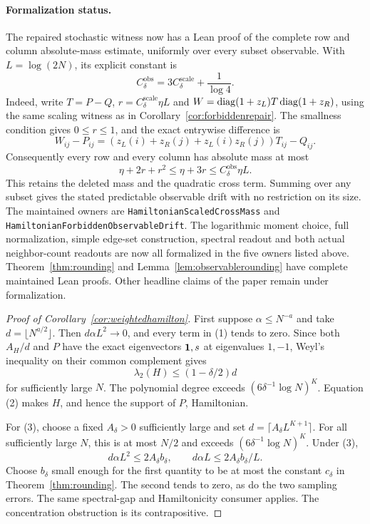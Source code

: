 \paragraph{Formalization status.}
The repaired stochastic witness now has a Lean proof of the complete
row and column absolute-mass estimate, uniformly over every subset
observable.  With \(L=\log(2N)\), its explicit constant is
\[
 C_\delta^{\mathrm{obs}}
 =3C_\delta^{\mathrm{scale}}+\frac1{\log4}.
\]
Indeed, write \(T=P-Q\), \(r=C_\delta^{\mathrm{scale}}\eta L\)
and \(W=\operatorname{diag}(1+z_L)T\operatorname{diag}(1+z_R)\), using the same scaling
witness as in Corollary~\ref{cor:forbiddenrepair}.
The smallness condition gives \(0\leq r\leq1\), and the exact
entrywise difference is
\[
 W_{ij}-P_{ij}
 =(z_L(i)+z_R(j)+z_L(i)z_R(j))T_{ij}-Q_{ij}.
\]
Consequently every row and every column has absolute mass at most
\[
 \eta+2r+r^2\leq\eta+3r
 \leq C_\delta^{\mathrm{obs}}\eta L .
\]
This retains the deleted mass and the quadratic cross term.
Summing over any subset gives the stated predictable observable drift
with no restriction on its size.  The maintained owners are
\texttt{HamiltonianScaledCrossMass} and
\texttt{HamiltonianForbiddenObservableDrift}.
The logarithmic moment choice, full normalization, simple edge-set
construction, spectral readout and both actual neighbor-count readouts
are now all formalized in the five owners listed above.
Theorem~\ref{thm:rounding} and Lemma~\ref{lem:observablerounding}
have complete maintained Lean proofs.
Other headline claims of the paper remain under formalization.


\begin{proof}[Proof of Corollary~\ref{cor:weightedhamilton}]
First suppose \(\alpha\leq N^{-a}\) and take
\(d=\lfloor N^{a/2}\rfloor\).
Then \(d\alpha L^2\to0\), and every term in (1) tends to zero.
Since both \(A_H/d\) and \(P\) have the exact eigenvectors
\(\mathbf1,s\) at eigenvalues \(1,-1\), Weyl's inequality on
their common complement gives
\[
 \lambda_2(H)\leq(1-\delta/2)d
\]
for sufficiently large \(N\).
The polynomial degree exceeds
\((6\delta^{-1}\log N)^K\).
Equation (2) makes \(H\), and hence the support of \(P\),
Hamiltonian.

For (3), choose a fixed \(A_\delta>0\) sufficiently large
and set \(d=\lceil A_\delta L^{K+1}\rceil\).
For all sufficiently large \(N\), this is at most \(N/2\)
and exceeds \((6\delta^{-1}\log N)^K\).
Under (3),
\[
 d\alpha L^2\leq 2A_\delta b_\delta,\qquad
 d\alpha L\leq 2A_\delta b_\delta/L.
\]
Choose \(b_\delta\) small enough for the first quantity to
be at most the constant \(c_\delta\) in Theorem~\ref{thm:rounding}.
The second tends to zero, as do the two sampling errors.
The same spectral-gap and Hamiltonicity consumer applies.
The concentration obstruction is its contrapositive.
\end{proof}

